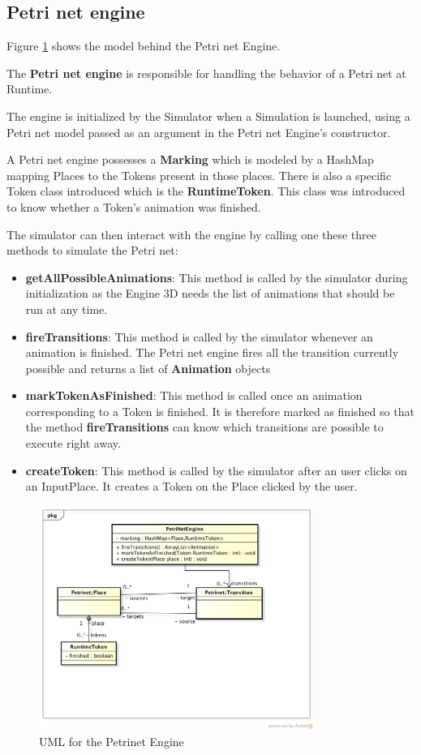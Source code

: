 \subsection{Petri net engine}

Figure \ref{fig:uml-petrinet-engine} shows the model behind the Petri net Engine.

The \textbf{Petri net engine} is responsible for handling the behavior of a Petri net at Runtime. 

The engine is initialized by the Simulator when a Simulation is launched, using a Petri net model passed as an argument in the Petri net Engine's constructor.

A Petri net engine possesses a \textbf{Marking} which is modeled by a HashMap mapping Places to the Tokens present in those places.
There is also a specific Token class introduced which is the \textbf{RuntimeToken}. This class was introduced to know whether a Token's animation was finished. 

The simulator can then interact with the engine by calling one these three methods to simulate the Petri net:

\begin{itemize}
  \item \textbf{getAllPossibleAnimations}: This method is called by the simulator during initialization as the Engine 3D needs the list of animations that should be run at any time. 
  \item \textbf{fireTransitions}: This method is called by the simulator whenever an animation is finished. The Petri net engine fires all the transition currently possible and returns a list of \textbf{Animation} objects
  \item \textbf{markTokenAsFinished}: This method is called once an animation corresponding to a Token is finished. It is therefore marked as finished so that the method \textbf{fireTransitions} can know which transitions are possible to execute right away.
  \item \textbf{createToken}: This method is called by the simulator after an user clicks on an InputPlace. It creates a Token on the Place clicked by the user.
\end{itemize}
 
\begin{figure}[htp]
\begin{center}
  \includegraphics[width=0.8\textwidth]{image/petrinet_engine.png}
  \caption{UML for the Petrinet Engine}
  \label{fig:uml-petrinet-engine}
\end{center}
\end{figure}


 

